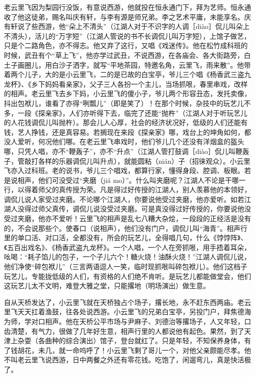 \documentclass[12pt,UTF8]{ctexbook}
\begin{document}
老云里飞因为梨园行没饭，有意说西游，他就投在恒永通门下，拜为艺师。恒永通收了他这徒弟，赐名叫庆有轩，与李有源是师兄弟。李之艺术平庸，未能享名。庆有轩说了些西游，他“朵上不清头”（江湖人对于不识字的人调［diào］侃儿叫朵上不清头），活儿的“万字短”（江湖人管说的书不长调侃儿叫万字短），上馆子做艺，只是个二路角色，亦不得志。他又弃了这行，又唱《戏迷传》。他在松竹成科班的时候，武丑有个“草上飞”，他亦学过武丑，不说西游，在各庙会、各大街路旁，白土子画圈儿，用白沙子洒字，就写“平地茶园，特邀名角，云里飞，雨来散”。他带着两个儿子，大的是小云里飞，二的是已故的白宝亭，爷儿三个唱《杨香武三盗九龙杯》、《乡下妈妈看亲家》，父子三人各扮一个主儿，当场抓哏，春里串戏，改样的相声。老云里飞去乡下妈，小云里飞的傻小子，爷儿两个形容丑态，发托卖像，抖出包袱儿，谁看了亦得“咧瓢儿”（即是笑了）！在那个时候，杂技中的玩艺儿不多，一段《探亲家》，人们亦听得下去，临完了还能“抛杵”（江湖人对于听玩艺儿的人花钱调侃儿叫抛杵）。那会儿人心厚，社会的经济状况好，低级的人们还能有钱，艺人挣钱，还是真容易。若搁现在来段《探亲家》哪，戏台上的坤角如何，都没人爱听，何况他们哪。在老云里飞串戏时，他们爷儿几个还没有洋烟盒的盔头哪，只凭人唱，亦不“鞭轰子”，亦不“升点”（江湖人管打鼓调［diào］侃儿叫鞭轰子，管敲打各样的乐器调侃儿叫升点），就能圆粘（nián）子（招徕观众）。小云里飞亦入过科班。老的说书，爷儿三个唱戏，都算行家，懂得身段、腔调、板眼。若是说相声，他们可没受过“夹磨（jiá mo）”。什么叫夹磨呢？江湖人不论是干哪一行，以得着师父的真传授为荣。凡是得过好传授的江湖人，别人羡慕他的本领好，调侃儿说人家受过夹磨。不论哪个江湖人，你要说他受过夹磨，他亦爱听。如若江湖人没得过师父真传，调侃儿说没受过夹磨。可是真没得过好传授的，你要说他没受过夹磨，他亦不爱听！云里飞的相声是乱七八糟大杂烩，一段段的正经活是没有的，不会说那些个。使春口（说相声），他们没有门户，调侃儿叫“海青”。相声行里的单口活、对口活，全都没有，所会的玩艺儿，全得唱几句，什么《饽饽阵》、《五百出戏名》、《杨香武盗九龙杯》。一个人唱，一个人在旁抓哏，用手捂着耳朵，吆喝：“耗子馅儿的包子，一个子儿六个！糖火烧！油酥火烧！”江湖人调侃儿说，他们净使“碎包袱儿”（三言两语逗人一笑，临时现抓哏叫碎包袱儿）。他们这档子玩艺儿，专能拢低级的人们，有资格的人们绝不肯听。是玩艺儿都能做堂会，他们这玩艺儿太不文明，难登大雅之堂，只能撂地（明场演出）做生意。

自从天桥发达了，小云里飞就在天桥独占个场子，撂长地，永不赶东西两庙。老云里飞天天扛着渔鼓，往各处说西游。小云里飞的兄弟白宝亭，另投门户，拜焦德海为师，学对口相声。他在天桥公平市场与尹麻子、刘德治等撂场子，人又年轻，口齿清楚，有气力，很做了几年好生意，相声行里的人都说他有起色。果然，到了天津上杂耍（各曲种的综合演出）馆子，登台就红了。只是年轻，不知保养身体，有了钱胡花，未几，就一命呜呼了！小云里飞剩了哥儿一个，对他父亲颇能尽孝。他不叫老云里飞说西游，日中两餐之外还有零花钱。吃饱了，闲遛弯儿，真是快活极了。
\end{document}
